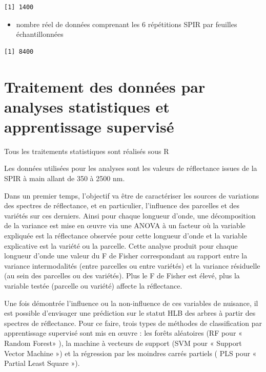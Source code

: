 \documentclass[
  11pt,
  french,
  a4paper,
  extrafontsizes,onecolumn,openright
  ]{memoir}
\providecommand{\tightlist}{%
  \setlength{\itemsep}{0pt}\setlength{\parskip}{0pt}}
\begin{document}
\scriptsize

\begin{verbatim}
[1] 1400
\end{verbatim}

\normalsize

\begin{itemize}
\tightlist
\item
  nombre réel de données comprenant les 6 répétitions SPIR par feuilles échantillonnées
\end{itemize}

\scriptsize

\begin{verbatim}
[1] 8400
\end{verbatim}

\normalsize

\vfill
\newpage

\hypertarget{traitement-des-donnuxe9es-par-analyses-statistiques-et-apprentissage-supervisuxe9}{%
\section{Traitement des données par analyses statistiques et apprentissage supervisé}\label{traitement-des-donnuxe9es-par-analyses-statistiques-et-apprentissage-supervisuxe9}}

Tous les traitements statistiques sont réalisés sous R \autocite{R}

Les données utilisées pour les analyses sont les valeurs de réflectance issues de la SPIR à main allant de 350 à 2500 nm.

Dans un premier temps, l'objectif va être de caractériser les sources de variations des spectres de réflectance, et en particulier, l'influence des parcelles et des variétés sur ces derniers. Ainsi pour chaque longueur d'onde, une décomposition de la variance est mise en œuvre via une ANOVA à un facteur où la variable expliquée est la réflectance observée pour cette longueur d'onde et la variable explicative est la variété ou la parcelle. Cette analyse produit pour chaque longueur d'onde une valeur du F de Fisher correspondant au rapport entre la variance intermodalités (entre parcelles ou entre variétés) et la variance résiduelle (au sein des parcelles ou des variétés). Plus le F de Fisher est élevé, plus la variable testée (parcelle ou variété) affecte la réflectance.

Une fois démontrée l'influence ou la non-influence de ces variables de nuisance, il est possible d'envisager une prédiction sur le statut HLB des arbres à partir des spectres de réflectance. Pour ce faire, trois types de méthodes de classification par apprentissage supervisé sont mis en œuvre : les forêts aléatoires (RF pour « Random Forest» ), la machine à vecteurs de support (SVM pour « Support Vector Machine ») et la régression par les moindres carrés partiels ( PLS pour « Partial Least Square »).
\end{document}
